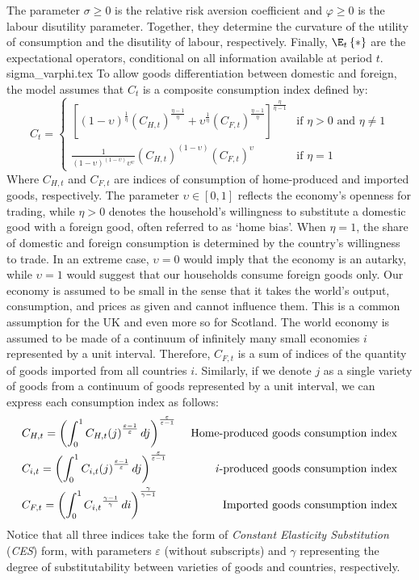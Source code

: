 The parameter $\sigma \geq 0$ is the relative risk aversion coefficient and $\varphi \geq 0$ is the labour disutility parameter. Together, they determine the curvature of the utility of consumption and the disutility of labour, respectively. Finally, $\E_t\left\{*\right\}$ are the expectational operators, conditional on all information available at period $t$.
{sigma_varphi.tex}
To allow goods differentiation between domestic and foreign, the model assumes that $C_t$ is a composite consumption index defined by:
\begin{equation}
 C_t = 
 \begin{cases}
 \left[ (1-\upsilon)^\frac{1}{\eta} (C_{H,t})^{\frac{\eta-1}{\eta}} + \upsilon^{\frac{1}{\eta}}(C_{F,t})^{\frac{\eta-1}{\eta}}\right]^{\frac{\eta}{\eta-1}} & \text{if $\eta > 0$ and $\eta \ne 1$} \\
 \frac{1}{(1-\upsilon)^{(1-\upsilon)}\upsilon^\upsilon}(C_{H,t})^{(1-\upsilon)}(C_{F,t})^\upsilon & \text{if $\eta = 1$}
 \end{cases}
\end{equation}
Where $C_{H,t}$ and $C_{F,t}$ are indices of consumption of home-produced and imported goods, respectively. The parameter $\upsilon \in [0,1]$ reflects the economy's openness for trading, while $\eta > 0$ denotes the household's willingness to substitute a domestic good with a foreign good, often referred to as `home bias'. When $\eta = 1$, the share of domestic and foreign consumption is determined by the country's willingness to trade. In an extreme case, $\upsilon = 0$ would imply that the economy is an autarky, while $\upsilon = 1$ would suggest that our households consume foreign goods only. Our economy is assumed to be small in the sense that it takes the world's output, consumption, and prices as given and cannot influence them. This is a common assumption for the UK and even more so for Scotland. The world economy is assumed to be made of a continuum of infinitely many small economies $i$ represented by a unit interval. Therefore, $C_{F,t}$ is a sum of indices of the quantity of goods imported from all countries $i$. Similarly, if we denote $j$ as a single variety of goods from a continuum of goods represented by a unit interval, we can express each consumption index as follows: 
\begin{align}
 &C_{H,t} = \left( \int_{0}^{1} {C_{H,t}(j)}^{\frac{\varepsilon-1}{\varepsilon}} \,dj \right)^\frac{\varepsilon}{\varepsilon-1} & \text{ Home-produced goods consumption index} \\
 &C_{i,t} = \left( \int_{0}^{1} {C_{i,t}(j)}^{\frac{\varepsilon-1}{\varepsilon}} \,dj \right)^\frac{\varepsilon}{\varepsilon-1} & \text{ \textit{i}-produced goods consumption index} \\
 &C_{F,t} = \left( \int_{0}^{1} {C_{i,t}}^{\frac{\gamma-1}{\gamma}} \,di \right)^{\frac{\gamma}{\gamma-1}} & \text{Imported goods consumption index}
\end{align}
Notice that all three indices take the form of \textit{Constant Elasticity Substitution} (\textit{CES}) form, with parameters $\varepsilon$ (without subscripts) and $\gamma$ representing the degree of substitutability between varieties of goods and countries, respectively.

